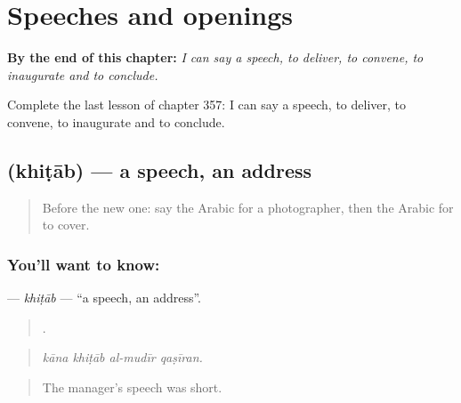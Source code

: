 
\chapter{Speeches and openings}
\label{ch:ar-speeches-and-openings}

\begin{chapteropening}
\textbf{By the end of this chapter:} \emph{I can say a speech, to deliver, to convene, to inaugurate and to conclude.}

Complete the last lesson of chapter 357: I can say a speech, to deliver, to convene, to inaugurate and to conclude.
\end{chapteropening}

\section[\texorpdfstring{\ar{خطاب} (khiṭāb)}{خطاب (khiṭāb)}]{ (khiṭāb) — a speech, an address}

\label{lesson:AR-C357-khitab}



\begin{quote}
Before the new one: say the Arabic for a photographer, then the Arabic for to cover.
\end{quote}

\subsection*{You'll want to know: }
\textbf{} — \emph{khiṭāb} — \textquotedblleft{}a speech, an address\textquotedblright{}.

\begin{quote}
   .
\end{quote}

\begin{quote}
\emph{kāna khiṭāb al-mudīr qaṣīran.}
\end{quote}

\begin{quote}
The manager’s speech was short.
\end{quote}

